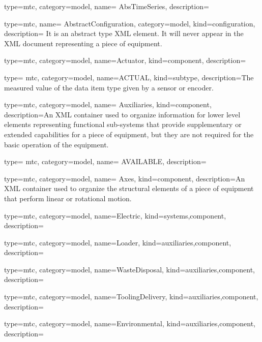

{
  type=mtc,
  category=model,
  name= {AbsTimeSeries},
  description= {}
}


{
  type=mtc,
  name= {AbstractConfiguration},
  category=model,
  kind={configuration},
  description= {It is an abstract type XML element.  It will never appear in the XML document representing a piece of equipment. }
}

{
  type=mtc,
  category=model,
  name={Actuator},
  kind={component},
  description={}
}

{
  type= mtc,
  category=model,
  name={ACTUAL},
  kind={subtype},
  description={The measured value of the data item type given by a sensor or encoder.}
}

{
  type=mtc,
  category=model,
  name= {Auxiliaries},
  kind={component},
  description={An XML container used to organize information for \gls{lower level} elements representing functional sub-systems that provide supplementary or extended capabilities for a piece of equipment, but they are not required for the basic operation of the equipment.}
}


{
  type= mtc,
  category=model,
  name= {AVAILABLE},
  description= {}
}


{
  type=mtc,
  category=model,
  name= {Axes},
  kind={component},
  description={An XML container used to organize the \glspl{structural element} of a piece of equipment that perform linear or rotational motion.}
}


{
  type=mtc,
  category=model,
  name={Electric},
  kind={systems,component},
  description={}
}


{
  type=mtc,
  category=model,
  name={Loader},
  kind={auxiliaries,component},
  description={}
}


{
  type=mtc,
  category=model,
  name={WasteDisposal},
  kind={auxiliaries,component},
  description={}
}


{
  type=mtc,
  category=model,
  name={ToolingDelivery},
  kind={auxiliaries,component},
  description={}
}


{
  type=mtc,
  category=model,
  name={Environmental},
  kind={auxiliaries,component},
  description={}
}


